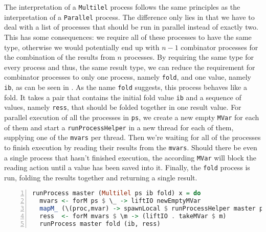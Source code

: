The interpretation of a \texttt{Multilel} process follows the same principles as the interpretation of a \texttt{Parallel} process. The difference only lies in that we have to deal with a list of processes that should be run in parallel instead of exactly two. This has some consequences: we require all of these processes to have the same type, otherwise we would potentially end up with $n-1$ combinator processes for the combination of the results from $n$ processes. By requiring the same type for every process and thus, the same result type, we can reduce the requirement for combinator processes to only one process, namely \texttt{fold}, and one value, namely \texttt{ib}, as can be seen in . As the name \texttt{fold} suggests, this process behaves like a fold. It takes a pair that contains the initial fold value \texttt{ib} and a sequence of values, namely \texttt{ress}, that should be folded together in one result value. For parallel execution of all the processes in \texttt{ps}, we create a new empty \texttt{MVar} for each of them and start a \texttt{runProcessHelper} in a new thread for each of them, supplying one of the \texttt{mvars} per thread. Then we're waiting for all of the processes to finish execution by reading their results from the \texttt{mvars}. Should there be even a single process that hasn't finished execution, the according \texttt{MVar} will block the reading action until a value has been saved into it. Finally, the \texttt{fold} process is run, folding the results together and returning a single result.
\begin{lstlisting}[language=Haskell,caption=Implementation of the interpreter for \texttt{Multilel} processes.,label=lst:runprocess_multilel,numbers=left,frame=bt]
runProcess master (Multilel ps ib fold) x = do
  mvars <- forM ps $ \_ -> liftIO newEmptyMVar
  mapM_ (\(proc,mvar) -> spawnLocal $ runProcessHelper master proc x mvar) (ps `zip` mvars)
  ress  <- forM mvars $ \m -> (liftIO . takeMVar $ m)
  runProcess master fold (ib, ress)
\end{lstlisting}


